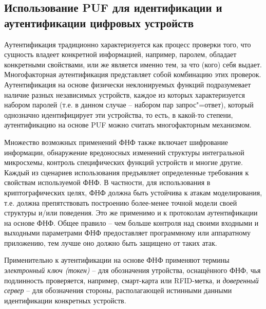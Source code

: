 \subsection{Использование PUF для идентификации и аутентификации цифровых устройств}
\label{sub:domain:puf_auth}
Аутентификация традиционно характеризуется как процесс проверки того, что сущность владеет конкретной информацией, например, паролем, обладает конкретными свойствами, или же является именно тем, за что (кого) себя выдает. Многофакторная аутентификация
представляет собой комбинацию этих проверок. Аутентификация на основе физически неклонируемых функций подразумевает наличие разных независимых устройств, каждое из которых характеризуется набором паролей (т.е. в данном случае -- набором пар запрос"=ответ), который однозначно идентифицирует эти устройства, то есть, в какой-то степени, аутентификацию на основе PUF можно считать многофакторным механизмом.

Множество возможных применений ФНФ также включает шифрование информации, обнаружение вредоносных изменений структуры интегральной микросхемы, контроль специфических функций устройств и многие другие. Каждый из сценариев использования предъявляет определенные требования к свойствам используемой ФНФ. В частности, для использования в криптографических целях, ФНФ должна быть устойчива к атакам моделирования, т.е. должна препятствовать построению более-менее точной модели своей структуры и/или поведения. Это же применимо и к протоколам аутентификации на основе ФНФ. Общее правило -- чем больше контроля над своими входными и выходными параметрами ФНФ предоставляет программному или аппаратному приложению, тем лучше оно должно быть защищено от таких атак.

Применительно к аутентификации на основе ФНФ применяют термины \emph{электронный ключ (токен)} -- для обозначения утройства, оснащённого ФНФ, чья подлинность проверяется, например, смарт-карта или RFID-метка, и \emph{доверенный сервер} -- для обозначения стороны, располагающей истинными данными идентификации конкретных устройств.

